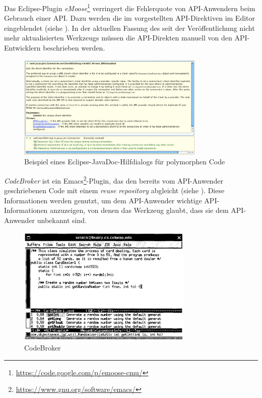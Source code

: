 Das Eclipse-Plugin \textit{eMoose}\footnote{\url{https://code.google.com/p/emoose-cmu/}} \cite{dekel2011increasing} verringert die Fehlerquote von API-Anwendern beim Gebrauch einer API. Dazu werden die im  vorgestellten API-Direktiven im Editor eingeblendet (siehe ). In der aktuellen Fassung des seit der Veröffentlichung nicht mehr aktualisierten Werkzeugs müssen die API-Direkten manuell von den API-Entwicklern beschrieben werden.

\begin{figure}
  \centering
    \includegraphics[width=0.8\textwidth]{Figures/tools/KnowledgePushing.png}
  \caption{Beispiel eines Eclipse-JavaDoc-Hilfdialogs für polymorphen Code \citep{dekel2011increasing}}
  \label{fig:KnowledgePushing}
\end{figure}


\textit{CodeBroker} \citep{Ye:2002fd} ist ein Emacs\footnote{\url{https://www.gnu.org/software/emacs/}}-Plugin, das den bereits vom API-Anwender geschriebenen Code mit einem \textit{reuse repository} abgleicht (siehe ). Diese Informationen werden genutzt, um dem API-Anwender wichtige API-Informationen anzuzeigen, von denen das Werkzeug glaubt, dass sie dem API-Anwender unbekannt sind.

\begin{figure}[!ht]
  \centering
    \includegraphics[width=0.75\textwidth]{Figures/tools/CodeBroker.png}
  \caption{CodeBroker \citep{Ye:2002fd}}
  \label{fig:CodeBroker}
\end{figure}


